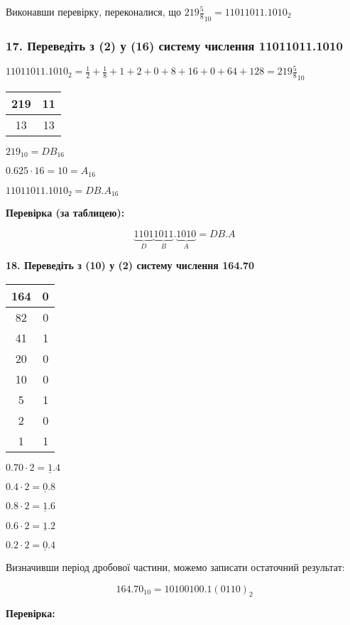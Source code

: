 \documentclass[14pt]{extreport}
\begin{document}
Виконавши перевірку, переконалися, що $219\frac{5}{8}_{10}=11011011.1010_2$

\subsubsection{17. Переведіть з (2) у (16) систему числення 11011011.1010}
$11011011.1010_2=\frac{1}{2}+\frac{1}{8}+
1+2+0+8+16+0+64+128=219\frac{5}{8}_{10}$

\bigskip
\begin{tabular}{c|c}
	219 & 11 \\
	\hline
	13 & 13 \\
\end{tabular}
\hspace{.1\textwidth}
$219_{10}=DB_{16}$

\medskip
$0.625\cdot16=10=A_{16}$

$11011011.1010_2=DB.A_{16}$

\bigskip
\textbf{Перевірка (за таблицею):}

$$\underbrace{1101}_D\underbrace{1011}_B.\underbrace{1010}_A=DB.A$$

\noindent\textbf{18. Переведіть з (10) у (2) систему числення 164.70}
\begin{multicols}{3}

\begin{tabular}{c|c}
	164 & 0 \\
	\hline
	82 & 0 \\
	\hline
	41 & 1 \\
	\hline
	20 & 0 \\
	\hline
	10 & 0 \\
	\hline
	5 & 1 \\
	\hline
	2 & 0 \\
	\hline
	1 & 1 \\
\end{tabular}

$0.70\cdot2=\underline{1}.4$

$0.4\cdot2=\underline{0}.8$

$0.8\cdot2=\underline{1}.6$

$0.6\cdot2=\underline{1}.2$

$0.2\cdot2=\underline{0}.4$

\end{multicols}
Визначивши період дробової частини,
можемо записати остаточний результат:

$$164.70_{10}=10100100.1(0110)_2$$

\bigskip
\textbf{Перевірка:}
\end{document}
